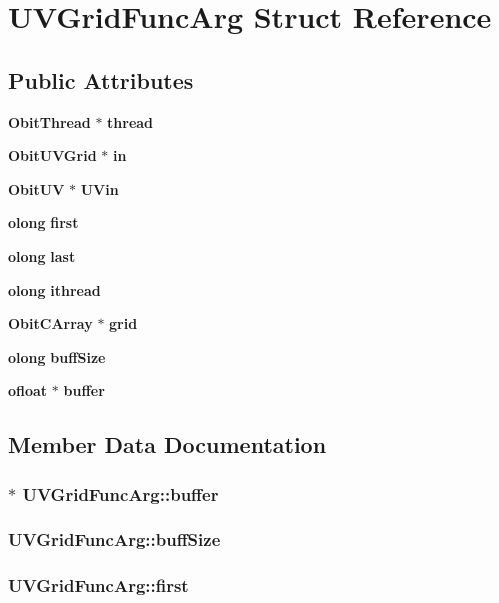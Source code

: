 \section{UVGrid\-Func\-Arg Struct Reference}
\label{structUVGridFuncArg}
\subsection*{Public Attributes}
\begin{CompactItemize}
\item 
{\bf Obit\-Thread} $\ast$ {\bf thread}
\item 
{\bf Obit\-UVGrid} $\ast$ {\bf in}
\item 
{\bf Obit\-UV} $\ast$ {\bf UVin}
\item 
{\bf olong} {\bf first}
\item 
{\bf olong} {\bf last}
\item 
{\bf olong} {\bf ithread}
\item 
{\bf Obit\-CArray} $\ast$ {\bf grid}
\item 
{\bf olong} {\bf buff\-Size}
\item 
{\bf ofloat} $\ast$ {\bf buffer}
\end{CompactItemize}


\subsection{Member Data Documentation}
\subsubsection{$\ast$ {\bf UVGrid\-Func\-Arg::buffer}}\label{structUVGridFuncArg_o8}


\subsubsection{ {\bf UVGrid\-Func\-Arg::buff\-Size}}\label{structUVGridFuncArg_o7}


\subsubsection{ {\bf UVGrid\-Func\-Arg::first}}\label{structUVGridFuncArg_o3}


